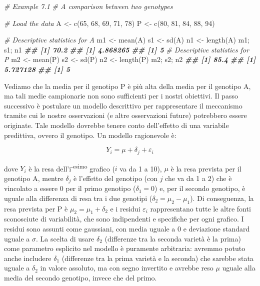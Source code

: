 \documentclass[
  12pt,
]{book}
\newenvironment{Shaded}{\begin{snugshade}}{\end{snugshade}}
\newcommand{\CommentTok}[1]{\textcolor[rgb]{0.56,0.35,0.01}{\textit{#1}}}
\newcommand{\DecValTok}[1]{\textcolor[rgb]{0.00,0.00,0.81}{#1}}
\newcommand{\DocumentationTok}[1]{\textcolor[rgb]{0.56,0.35,0.01}{\textbf{\textit{#1}}}}
\newcommand{\FunctionTok}[1]{\textcolor[rgb]{0.00,0.00,0.00}{#1}}
\newcommand{\NormalTok}[1]{#1}
\newcommand{\OtherTok}[1]{\textcolor[rgb]{0.56,0.35,0.01}{#1}}
\begin{document}
\begin{Shaded}
\begin{Highlighting}[]
\CommentTok{\# Example 7.1}
\CommentTok{\# A comparison between two genotypes}

\CommentTok{\# Load the data}
\NormalTok{A }\OtherTok{\textless{}{-}} \FunctionTok{c}\NormalTok{(}\DecValTok{65}\NormalTok{, }\DecValTok{68}\NormalTok{, }\DecValTok{69}\NormalTok{, }\DecValTok{71}\NormalTok{, }\DecValTok{78}\NormalTok{)}
\NormalTok{P }\OtherTok{\textless{}{-}} \FunctionTok{c}\NormalTok{(}\DecValTok{80}\NormalTok{, }\DecValTok{81}\NormalTok{, }\DecValTok{84}\NormalTok{, }\DecValTok{88}\NormalTok{, }\DecValTok{94}\NormalTok{)}

\CommentTok{\# Descriptive statistics for A}
\NormalTok{m1 }\OtherTok{\textless{}{-}} \FunctionTok{mean}\NormalTok{(A)}
\NormalTok{s1 }\OtherTok{\textless{}{-}} \FunctionTok{sd}\NormalTok{(A)}
\NormalTok{n1 }\OtherTok{\textless{}{-}} \FunctionTok{length}\NormalTok{(A)}
\NormalTok{m1; s1; n1}
\DocumentationTok{\#\# [1] 70.2}
\DocumentationTok{\#\# [1] 4.868265}
\DocumentationTok{\#\# [1] 5}
\CommentTok{\# Descriptive statistics for P}
\NormalTok{m2 }\OtherTok{\textless{}{-}} \FunctionTok{mean}\NormalTok{(P)}
\NormalTok{s2 }\OtherTok{\textless{}{-}} \FunctionTok{sd}\NormalTok{(P)}
\NormalTok{n2 }\OtherTok{\textless{}{-}} \FunctionTok{length}\NormalTok{(P)}
\NormalTok{m2; s2; n2}
\DocumentationTok{\#\# [1] 85.4}
\DocumentationTok{\#\# [1] 5.727128}
\DocumentationTok{\#\# [1] 5}
\end{Highlighting}
\end{Shaded}

Vediamo che la media per il genotipo P è più alta della media per il genotipo A, ma tali medie campionarie non sono sufficienti per i nostri obiettivi. Il passo successivo è postulare un modello descrittivo per rappresentare il meccanismo tramite cui le nostre osservazioni (e altre osservazioni future) potrebbero essere originate. Tale modello dovrebbe tenere conto dell'effetto di una variabile predittiva, ovvero il genotipo. Un modello ragionevole è:

\[
Y_i = \mu + \delta_j + \varepsilon_{i}
\]

dove \(Y_i\) è la resa dell'i\textsuperscript{-esimo} grafico (\(i\) va da 1 a 10), \(\mu\) è la resa prevista per il genotipo A, mentre \(\delta_j\) è l'effetto del genotipo (con \(j\) che va da 1 a 2) che è vincolato a essere 0 per il primo genotipo (\(\delta_1 = 0\)) e, per il secondo genotipo, è uguale alla differenza di resa tra i due genotipi (\(\delta_2 = \mu_2 - \mu_1\)). Di conseguenza, la resa prevista per P è \(\mu_2 = \mu_1 + \delta_2\) e i residui \(\varepsilon_i\) rappresentano tutte le altre fonti sconosciute di variabilità, che sono indipendenti e specifiche per ogni grafico. I residui sono assunti come gaussiani, con media uguale a 0 e deviazione standard uguale a \(\sigma\). La scelta di usare \(\delta_2\) (differenze tra la seconda varietà è la prima) come parametro esplicito nel modello è puramente arbitraria: avremmo potuto anche includere \(\delta_1\) (differenze tra la prima varietà e la seconda) che sarebbe stata uguale a \(\delta_2\) in valore assoluto, ma con segno invertito e avrebbe reso \(\mu\) uguale alla media del secondo genotipo, invece che del primo.
\end{document}
